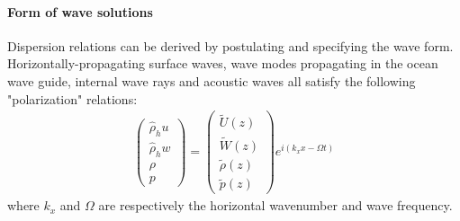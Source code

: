 \documentclass[a4paper,11pt]{article}
\begin{document}
\paragraph{Form of wave solutions}
Dispersion relations can be derived by postulating and specifying the wave form. Horizontally-propagating surface waves, wave modes propagating in the ocean wave guide, internal wave rays and acoustic waves all satisfy the following "polarization" relations:
\label{SubSectionPropag}
%
\begin{subequations}
  \begin{alignat}{2}
  \displaystyle
  \left(
  \begin{array}{c}
    \hat{\rho}_h u\\
    \hat{\rho}_h w\\
    \rho\\
    p
  \end{array}
  \right)
  =
  \left(
  \begin{array}{c}
    \widetilde{U}(z)\\
    \widetilde{W}(z)\\
    \widetilde{\rho}(z)\\
    \widetilde{p}(z)
  \end{array}
  \right)
  e^{i(k_xx-\Omega t)}
\end{alignat}
\end{subequations}
%
where $k_x$ and $\Omega$ are respectively the horizontal wavenumber and wave frequency.
\end{document}
